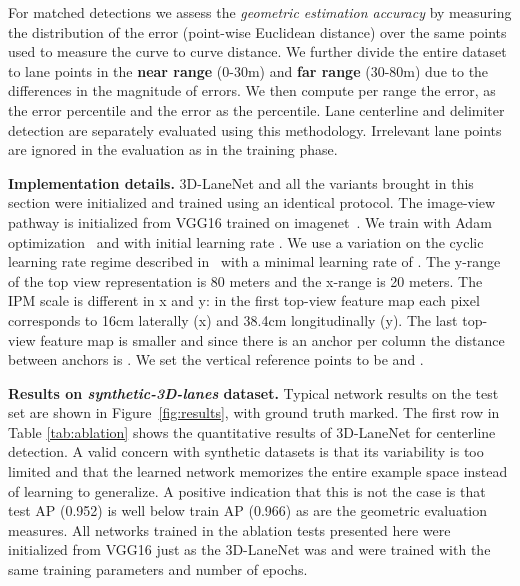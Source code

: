 \documentclass[10pt,twocolumn,letterpaper]{article}
\begin{document}
For matched detections we assess the \textit{geometric estimation accuracy} by measuring the distribution of the error (point-wise Euclidean distance) over the same points used to measure the curve to curve distance. We further divide the entire dataset to lane points in the \textbf{near range} (0-30m) and \textbf{far range} (30-80m) due to the differences in the magnitude of errors. We then compute per range the  error, as the  error percentile and the  error as the  percentile. Lane centerline and delimiter detection are separately evaluated using this methodology. Irrelevant lane points are ignored in the evaluation as in the training phase.

\textbf{Implementation details.} 3D-LaneNet and all the variants brought in this section were initialized and trained using an identical protocol. The image-view pathway is initialized from VGG16 trained on imagenet~\cite{imagenet_cvpr09}. We train with Adam optimization~\cite{adam} and with initial learning rate . We use a variation on the cyclic learning rate regime described in~\cite{cyclic_lr} with a minimal learning rate of . The y-range of the top view representation is 80 meters and the x-range is 20 meters. The IPM scale is different in x and y: in the first top-view feature map each pixel corresponds to 16cm laterally (x) and 38.4cm longitudinally (y). The last top-view feature map is  smaller and since there is an anchor per column the distance between anchors is . We set the  vertical reference points to be  and . 

\textbf{Results on \textit{synthetic-3D-lanes} dataset.} Typical network results on the test set are shown in Figure~\ref{fig:results}, with ground truth marked. The first row in Table \ref{tab:ablation} shows the quantitative results of 3D-LaneNet for centerline detection. A valid concern with synthetic datasets is that its variability is too limited and that the learned network memorizes the entire example space instead of learning to generalize. A positive indication that this is not the case is that test AP (0.952) is well below train AP (0.966) as are the geometric evaluation measures. All networks trained in the ablation tests presented here were initialized from VGG16 just as the 3D-LaneNet was and were trained with the same training parameters and number of epochs.
\end{document}
